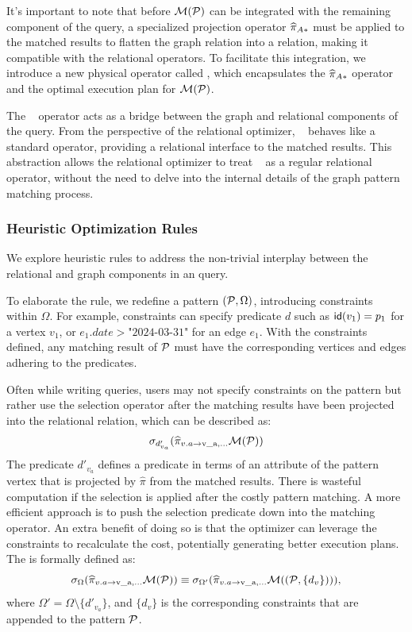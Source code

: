 It's important to note that before $\mathcal{M}(\mathcal{P})$ can be integrated with the remaining \spj component of the query, a specialized projection operator $\widehat{\pi}_{A*}$ must be applied to the matched results to flatten the graph relation into a relation, making it compatible with the relational operators. To facilitate this integration, we introduce a new physical operator called \scangraphtable, which encapsulates the $\widehat{\pi}_{A*}$ operator and the optimal execution plan for $\mathcal{M}(\mathcal{P})$.

The \scangraphtable~ operator acts as a bridge between the graph and relational components of the query. From the perspective of the relational optimizer, \scangraphtable~ behaves like a standard \scan operator, providing a relational interface to the matched results. This abstraction allows the relational optimizer to treat \scangraphtable~ as a regular relational operator, without the need to delve into the internal details of the graph pattern matching process.

\subsubsection{Heuristic Optimization Rules}
We explore heuristic rules to address the non-trivial interplay between the relational and graph components in an \spjm query.


 To elaborate the rule, we redefine a pattern $(\mathcal{P}, \Omega)$, introducing constraints within $\Omega$. For example, constraints can specify predicate $d$ such as ${\mathsf{id}}(v_1) = p_1$ for a vertex $v_1$, or $e_1.date > \text{"2024-03-31"}$ for an edge $e_1$. With the constraints defined, any matching result of $\mathcal{P}$ must have the corresponding vertices and edges adhering to the predicates.

Often while writing queries, users may not specify constraints on the pattern but rather use the selection operator after the matching results have been projected into the relational relation, which can be described as:
\[
\sigma_{d'_{v_a}} (\widehat{\pi}_{v.a \rightarrow \text{v\_a}, \ldots} \mathcal{M}(\mathcal{P}))
\]
The predicate $d'_{v_a}$ defines a predicate in terms of an attribute of the pattern vertex that is projected by $\widehat{\pi}$ from the matched results. There is wasteful computation if the selection is applied after the costly pattern matching. A more efficient approach is to push the selection predicate down into the matching operator. An extra benefit of doing so is that the optimizer can leverage the constraints to recalculate the cost, potentially generating better execution plans. The \filterrule is formally defined as:
\begin{equation*}
\sigma_{\Omega} (\widehat{\pi}_{v.a \rightarrow \text{v\_a}, \ldots} \mathcal{M}(\mathcal{P})) \\
\equiv \sigma_{\Omega'} (\widehat{\pi}_{v.a \rightarrow \text{v\_a}, \ldots} \mathcal{M}((\mathcal{P}, \{d_v\}))),
\end{equation*}
where $\Omega' = \Omega \setminus \{d'_{v_a}\}$, and $\{d_v\}$ is the corresponding constraints that are appended to the pattern $\mathcal{P}$.

